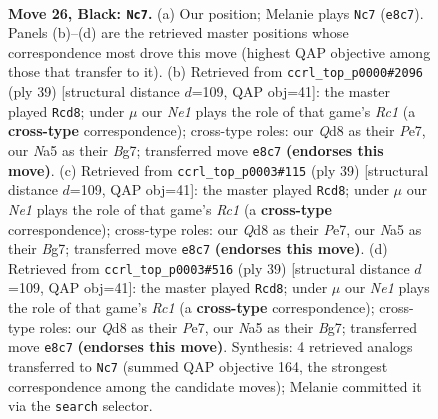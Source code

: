 \documentclass[11pt]{article}
\begin{document}
\clearpage

\begin{figure}[p]\centering
\begin{subfigure}{0.46\textwidth}\centering
\resizebox{\linewidth}{!}{%
\newchessgame
\chessboard[
  setfen={2bqn2r/4bpk1/p5p1/n1BBp2p/P3P3/N2PQ2N/1rP1RPPP/R4K2 b - - 5 26},
  showmover=false,
  pgfstyle=straightmove, color=movearrow, markmove={e8-c7}
]}
\caption{}
\end{subfigure}\hfill
\begin{subfigure}{0.46\textwidth}\centering
\resizebox{\linewidth}{!}{%
\newchessgame
\chessboard[
  setfen={2r3k1/1p2ppb1/pq3n1p/4pPp1/3rN3/3B1Q1P/PPP2PP1/1R2R1K1 b - - 7 20},
  showmover=false,
  pgfstyle=straightmove, color=movearrow, markmove={c8-d8}
]}
\caption{}
\end{subfigure}
\\[4pt]
\begin{subfigure}{0.46\textwidth}\centering
\resizebox{\linewidth}{!}{%
\newchessgame
\chessboard[
  setfen={2r3k1/1p2ppb1/pq3n1p/4pPp1/3rN3/3B1Q1P/PPP2PP1/1R2R1K1 b - - 7 20},
  showmover=false,
  pgfstyle=straightmove, color=movearrow, markmove={c8-d8}
]}
\caption{}
\end{subfigure}\hfill
\begin{subfigure}{0.46\textwidth}\centering
\resizebox{\linewidth}{!}{%
\newchessgame
\chessboard[
  setfen={2r3k1/1p2ppb1/pq3n1p/4pPp1/3rN3/3B1Q1P/PPP2PP1/1R2R1K1 b - - 7 20},
  showmover=false,
  pgfstyle=straightmove, color=movearrow, markmove={c8-d8}
]}
\caption{}
\end{subfigure}
\caption{\textbf{Move 26, Black: \texttt{Nc7}.} (a) Our position; Melanie plays \texttt{Nc7} (\texttt{e8c7}). Panels (b)--(d) are the retrieved master positions whose correspondence most drove this move (highest QAP objective among those that transfer to it). (b) Retrieved from \texttt{ccrl\_top\_p0000\#2096} (ply 39) [structural distance $d$=109, QAP obj=41]: the master played \texttt{Rcd8}; under $\mu$ our \emph{Ne1} plays the role of that game's \emph{Rc1} (a \textbf{cross-type} correspondence); cross-type roles: our \emph{Q}d8 as their \emph{P}e7, our \emph{N}a5 as their \emph{B}g7; transferred move \texttt{e8c7} \textbf{(endorses this move)}. (c) Retrieved from \texttt{ccrl\_top\_p0003\#115} (ply 39) [structural distance $d$=109, QAP obj=41]: the master played \texttt{Rcd8}; under $\mu$ our \emph{Ne1} plays the role of that game's \emph{Rc1} (a \textbf{cross-type} correspondence); cross-type roles: our \emph{Q}d8 as their \emph{P}e7, our \emph{N}a5 as their \emph{B}g7; transferred move \texttt{e8c7} \textbf{(endorses this move)}. (d) Retrieved from \texttt{ccrl\_top\_p0003\#516} (ply 39) [structural distance $d$=109, QAP obj=41]: the master played \texttt{Rcd8}; under $\mu$ our \emph{Ne1} plays the role of that game's \emph{Rc1} (a \textbf{cross-type} correspondence); cross-type roles: our \emph{Q}d8 as their \emph{P}e7, our \emph{N}a5 as their \emph{B}g7; transferred move \texttt{e8c7} \textbf{(endorses this move)}. Synthesis: 4 retrieved analogs transferred to \texttt{Nc7} (summed QAP objective 164, the strongest correspondence among the candidate moves); Melanie committed it via the \texttt{search} selector.}
\label{fig:thought-m51}
\end{figure}
\end{document}
